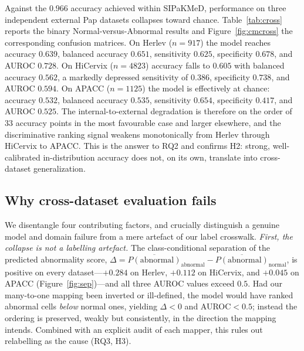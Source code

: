 Against the $0.966$ accuracy achieved within SIPaKMeD, performance on three independent external Pap datasets collapses toward chance. Table~\ref{tab:cross} reports the binary Normal-versus-Abnormal results and Figure~\ref{fig:cmcross} the corresponding confusion matrices. On Herlev \citep{jantzen2005herlev} ($n=917$) the model reaches accuracy $0.639$, balanced accuracy $0.651$, sensitivity $0.625$, specificity $0.678$, and AUROC $0.728$. On HiCervix \citep{cai2024hicervix} ($n=4823$) accuracy falls to $0.605$ with balanced accuracy $0.562$, a markedly depressed sensitivity of $0.386$, specificity $0.738$, and AUROC $0.594$. On APACC ($n=1125$) the model is effectively at chance: accuracy $0.532$, balanced accuracy $0.535$, sensitivity $0.654$, specificity $0.417$, and AUROC $0.525$. The internal-to-external degradation is therefore on the order of $33$ accuracy points in the most favourable case and larger elsewhere, and the discriminative ranking signal weakens monotonically from Herlev through HiCervix to APACC. This is the answer to RQ2 and confirms H2: strong, well-calibrated in-distribution accuracy does not, on its own, translate into cross-dataset generalization.

\subsection{Why cross-dataset evaluation fails}

We disentangle four contributing factors, and crucially distinguish a genuine model and domain failure from a mere artefact of our label crosswalk. \emph{First, the collapse is not a labelling artefact.} The class-conditional separation of the predicted abnormality score, $\Delta = \overline{P(\text{abnormal})}_{\text{abnormal}} - \overline{P(\text{abnormal})}_{\text{normal}}$, is positive on every dataset---$+0.284$ on Herlev, $+0.112$ on HiCervix, and $+0.045$ on APACC (Figure~\ref{fig:sep})---and all three AUROC values exceed $0.5$. Had our many-to-one mapping been inverted or ill-defined, the model would have ranked abnormal cells \emph{below} normal ones, yielding $\Delta<0$ and AUROC$<0.5$; instead the ordering is preserved, weakly but consistently, in the direction the mapping intends. Combined with an explicit audit of each mapper, this rules out relabelling as the cause (RQ3, H3).

